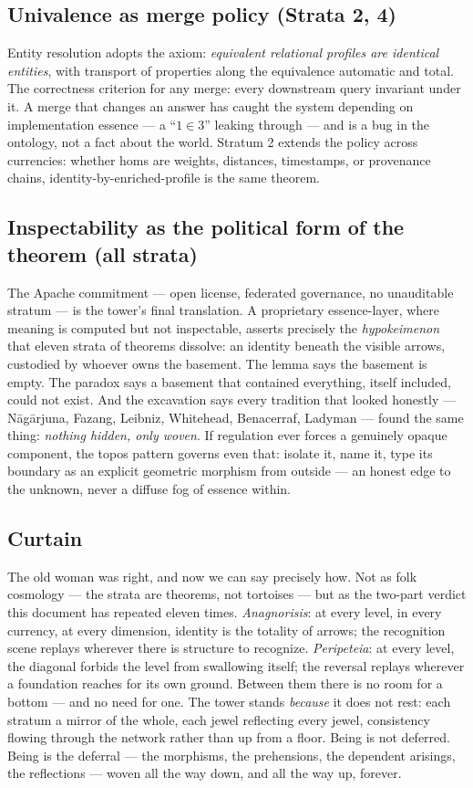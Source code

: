 \documentclass[11pt]{article}
\theoremstyle{plain}
\theoremstyle{definition}
\theoremstyle{remark}
\begin{document}
\subsection{Univalence as merge policy (Strata 2, 4)}

Entity resolution adopts the axiom: \emph{equivalent relational profiles are identical entities}, with transport of properties along the equivalence automatic and total. The correctness criterion for any merge: every downstream query invariant under it. A merge that changes an answer has caught the system depending on implementation essence --- a ``$1 \in 3$'' leaking through --- and is a bug in the ontology, not a fact about the world. Stratum 2 extends the policy across currencies: whether homs are weights, distances, timestamps, or provenance chains, identity-by-enriched-profile is the same theorem.

\subsection{Inspectability as the political form of the theorem (all strata)}

The Apache commitment --- open license, federated governance, no unauditable stratum --- is the tower's final translation. A proprietary essence-layer, where meaning is computed but not inspectable, asserts precisely the \emph{hypokeimenon} that eleven strata of theorems dissolve: an identity beneath the visible arrows, custodied by whoever owns the basement. The lemma says the basement is empty. The paradox says a basement that contained everything, itself included, could not exist. And the excavation says every tradition that looked honestly --- N\=ag\=arjuna, Fazang, Leibniz, Whitehead, Benacerraf, Ladyman --- found the same thing: \emph{nothing hidden, only woven}. If regulation ever forces a genuinely opaque component, the topos pattern governs even that: isolate it, name it, type its boundary as an explicit geometric morphism from outside --- an honest edge to the unknown, never a diffuse fog of essence within.

\subsection{Curtain}

The old woman was right, and now we can say precisely how. Not as folk cosmology --- the strata are theorems, not tortoises --- but as the two-part verdict this document has repeated eleven times. \emph{Anagnorisis}: at every level, in every currency, at every dimension, identity is the totality of arrows; the recognition scene replays wherever there is structure to recognize. \emph{Peripeteia}: at every level, the diagonal forbids the level from swallowing itself; the reversal replays wherever a foundation reaches for its own ground. Between them there is no room for a bottom --- and no need for one. The tower stands \emph{because} it does not rest: each stratum a mirror of the whole, each jewel reflecting every jewel, consistency flowing through the network rather than up from a floor. Being is not deferred. Being is the deferral --- the morphisms, the prehensions, the dependent arisings, the reflections --- woven all the way down, and all the way up, forever.
\end{document}
